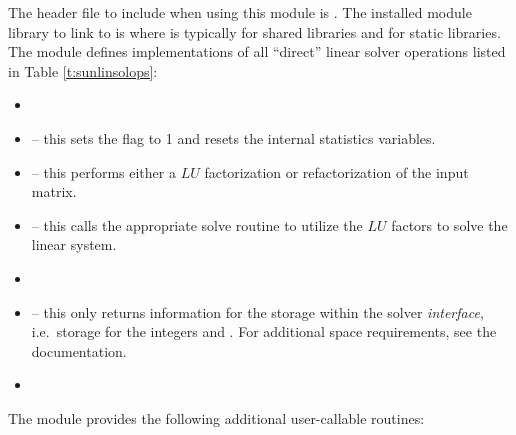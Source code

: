 \noindent The header file to include when using this module 
is . The installed module
library to link to is
where  is typically  for shared libraries and
 for static libraries. \\


\noindent The {\sunlinsolslumt} module defines implementations of all
``direct'' linear solver operations listed in
Table \ref{t:sunlinsolops}:
\begin{itemize}
\item {}
\item {} -- this sets the
   flag to 1 and resets the internal {\superlumt}
  statistics variables.
\item {} -- this performs either a $LU$
  factorization or refactorization of the input matrix.
\item {} -- this calls the appropriate
  {\superlumt} solve routine to utilize the $LU$ factors to solve the
  linear system. 
\item {}
\item {} -- this only returns information for
  the storage within the solver \emph{interface}, i.e.~storage for the
  integers  and .  For additional
  space requirements, see the {\superlumt} documentation.
\item {}
\end{itemize}
The module {\sunlinsolslumt} provides the following additional
user-callable routines: 
